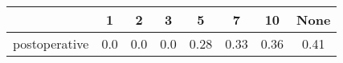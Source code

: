 \documentclass{article}%
\begin{document}
%
\normalsize%
\begin{tabular}{|c|c|c|c|c|c|c|c|}%
\hline%
&1&2&3&5&7&10&None\\%
\hline%
postoperative&0.0&0.0&0.0&0.28&0.33&0.36&0.41\\%
\hline%
\end{tabular}%
\end{document}
